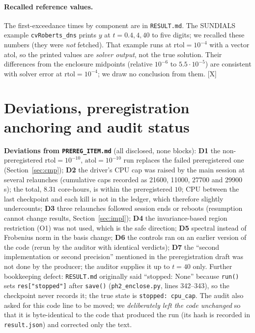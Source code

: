 \documentclass[11pt]{article}
\newcommand{\tier}[1]{\textsf{[#1]}}
\newcommand{\tX}{\tier{X}}
\theoremstyle{remark}
\begin{document}
\paragraph{Recalled reference values.} The first-exceedance times by component are in \texttt{RESULT.md}. The SUNDIALS example \texttt{cvRoberts\_dns} prints $y$ at $t=0.4,4,40$ to five digits; we recalled these numbers (they were \emph{not} fetched). That example runs at $\mathrm{rtol}=10^{-4}$ with a vector atol, so the printed values are \emph{solver output}, not the true solution. Their differences from the enclosure midpoints (relative $10^{-6}$ to $5.5\cdot10^{-5}$) are consistent with solver error at $\mathrm{rtol}=10^{-4}$; we draw no conclusion from them. \tX{}

\section{Deviations, preregistration anchoring and audit status}\label{sec:dev}
\textbf{Deviations from \texttt{PREREG\_ITEM.md}} (all disclosed, none blocks):
\textbf{D1} the non-preregistered $\mathrm{rtol}=10^{-10}$, $\mathrm{atol}=10^{-10}$ run replaces the failed preregistered one (Section~\ref{sec:cmp});
\textbf{D2} the driver's CPU cap was raised by the main session at several relaunches (cumulative caps recorded as 21600, 11000, 27700 and 29900 s); the total, $8.31$ core-hours, is within the preregistered $10$; CPU between the last checkpoint and each kill is not in the ledger, which therefore slightly undercounts;
\textbf{D3} three relaunches followed session ends or reboots (resumption cannot change results, Section~\ref{sec:impl});
\textbf{D4} the invariance-based region restriction (O1) was not used, which is the safe direction;
\textbf{D5} spectral instead of Frobenius norm in the basis change;
\textbf{D6} the controls ran on an earlier version of the code (rerun by the auditor with identical verdicts);
\textbf{D7} the ``second implementation or second precision'' mentioned in the preregistration draft was not done by the producer; the auditor supplies it up to $t=40$ only.
Further bookkeeping defect: \texttt{RESULT.md} originally said ``stopped: None'' because \texttt{run()} sets \texttt{res["stopped"]} after \texttt{save()} (\texttt{ph2\_enclose.py}, lines 342--343), so the checkpoint never records it; the true state is \texttt{stopped: cpu\_cap}. The audit also asked for this code line to be moved; we \emph{deliberately left the code unchanged} so that it is byte-identical to the code that produced the run (its hash is recorded in \texttt{result.json}) and corrected only the text.
\end{document}
